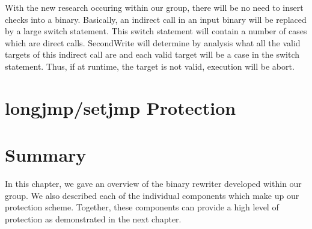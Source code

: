 With the new research occuring within our group, there will be no need to insert checks into a
binary. Basically, an indirect call in an input binary will be replaced by a large switch statement.
This switch statement will contain a number of cases which are direct calls. SecondWrite will
determine by analysis what all the valid targets of this indirect call are and each valid target
will be a case in the switch statement. Thus, if at runtime, the target is not valid, execution will
be abort. 

\section{longjmp/setjmp Protection}

\section{Summary}

In this chapter, we gave an overview of the binary rewriter developed within our group. We also
described each of the individual components which make up our protection scheme. Together, these
components can provide a high level of protection as demonstrated in the next chapter.

